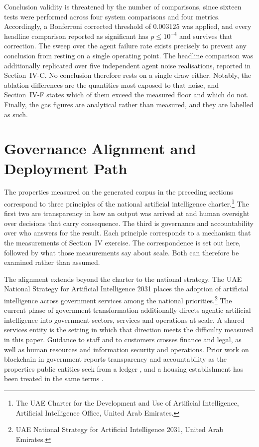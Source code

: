 \documentclass[journal]{IEEEtran}
\begin{document}
Conclusion validity is threatened by the number of comparisons, since sixteen tests were performed across four system comparisons and four metrics. Accordingly, a Bonferroni corrected threshold of $0.003125$ was applied, and every headline comparison reported as significant has $p\le10^{-4}$ and survives that correction. The sweep over the agent failure rate exists precisely to prevent any conclusion from resting on a single operating point. The headline comparison was additionally replicated over five independent agent noise realisations, reported in Section~IV-C. No conclusion therefore rests on a single draw either. Notably, the ablation differences are the quantities most exposed to that noise, and Section~IV-F states which of them exceed the measured floor and which do not. Finally, the gas figures are analytical rather than measured, and they are labelled as such.

\section{Governance Alignment and Deployment Path}

The properties measured on the generated corpus in the preceding sections correspond to three principles of the national artificial intelligence charter.\footnote{The UAE Charter for the Development and Use of Artificial Intelligence, Artificial Intelligence Office, United Arab Emirates.} The first two are transparency in how an output was arrived at and human oversight over decisions that carry consequence. The third is governance and accountability over who answers for the result. Each principle corresponds to a mechanism that the measurements of Section~IV exercise. The correspondence is set out here, followed by what those measurements say about scale. Both can therefore be examined rather than assumed.

The alignment extends beyond the charter to the national strategy. The UAE National Strategy for Artificial Intelligence 2031 places the adoption of artificial intelligence across government services among the national priorities.\footnote{UAE National Strategy for Artificial Intelligence 2031, United Arab Emirates.} The current phase of government transformation additionally directs agentic artificial intelligence into government sectors, services and operations at scale. A shared services entity is the setting in which that direction meets the difficulty measured in this paper. Guidance to staff and to customers crosses finance and legal, as well as human resources and information security and operations. Prior work on blockchain in government reports transparency and accountability as the properties public entities seek from a ledger \cite{almiani2026government}, and a housing establishment has been treated in the same terms \cite{almiani2024housing}.
\end{document}
